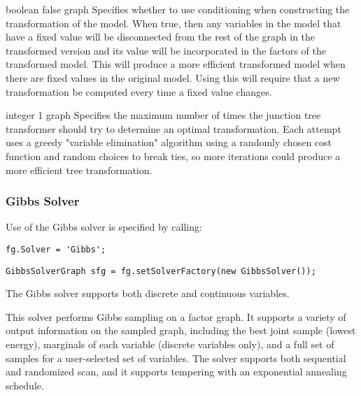 
{boolean}
{false}
{graph}
{Specifies whether to use conditioning when constructing the transformation of the model. When true, then any variables in the model that have a fixed value will be disconnected from the rest of the graph in the transformed version and its value will be incorporated in the factors of the transformed model. This will produce a more efficient transformed model when there are fixed values in the original model. Using this will require that a new transformation be computed every time a fixed value changes.}


{integer}
{1}
{graph}
{Specifies the maximum number of times the junction tree transformer should try to determine an optimal transformation. Each attempt uses a greedy "variable elimination" algorithm using a randomly chosen cost function and random choices to break ties, so more iterations could produce a more efficient tree transformation.}


\clearpage
\subsubsection{Gibbs Solver}
\label{sec:GibbsSolverAPI}

Use of the Gibbs solver is specified by calling:

\ifmatlab
\begin{lstlisting}
fg.Solver = 'Gibbs';
\end{lstlisting}
\fi


\ifjava
\begin{lstlisting}
GibbsSolverGraph sfg = fg.setSolverFactory(new GibbsSolver());
\end{lstlisting}
\fi

The Gibbs solver supports both discrete and continuous variables.

This solver performs Gibbs sampling on a factor graph.  It supports a variety of output information on the sampled graph, including the best joint sample (lowest energy), marginals of each variable (discrete variables only), and a full set of samples for a user-selected set of variables.  The solver supports both sequential and randomized scan, and it supports tempering with an exponential annealing schedule.

